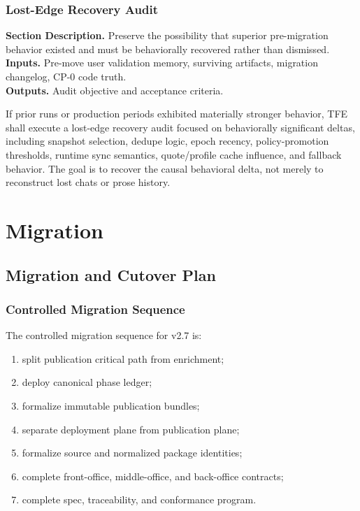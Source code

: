 \documentclass[11pt]{report}
\newcommand{\meta}[3]{\textbf{Section Description.} #1\\
\textbf{Inputs.} #2\\
\textbf{Outputs.} #3\par}
\begin{document}
\section{Lost-Edge Recovery Audit}
\meta{Preserve the possibility that superior pre-migration behavior existed and must be behaviorally recovered rather than dismissed.}{Pre-move user validation memory, surviving artifacts, migration changelog, CP-0 code truth.}{Audit objective and acceptance criteria.}

If prior runs or production periods exhibited materially stronger behavior, TFE shall execute a lost-edge recovery audit focused on behaviorally significant deltas, including snapshot selection, dedupe logic, epoch recency, policy-promotion thresholds, runtime sync semantics, quote/profile cache influence, and fallback behavior. The goal is to recover the causal behavioral delta, not merely to reconstruct lost chats or prose history.

\part{Migration}

\chapter{Migration and Cutover Plan}
\section{Controlled Migration Sequence}
The controlled migration sequence for v2.7 is:
\begin{enumerate}[leftmargin=1.2cm]
    \item split publication critical path from enrichment;
    \item deploy canonical phase ledger;
    \item formalize immutable publication bundles;
    \item separate deployment plane from publication plane;
    \item formalize source and normalized package identities;
    \item complete front-office, middle-office, and back-office contracts;
    \item complete spec, traceability, and conformance program.
\end{enumerate}
\end{document}
